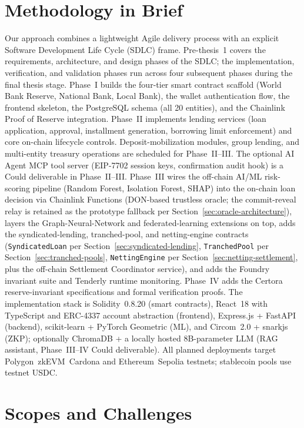 \documentclass[12pt,a4paper]{report}
\begin{document}
\section{Methodology in Brief}

Our approach combines a lightweight Agile delivery process with an explicit Software Development Life Cycle (SDLC) frame. Pre-thesis~1 covers the requirements, architecture, and design phases of the SDLC; the implementation, verification, and validation phases run across four subsequent phases during the final thesis stage. Phase~I builds the four-tier smart contract scaffold (World Bank Reserve, National Bank, Local Bank), the wallet authentication flow, the frontend skeleton, the PostgreSQL schema (all 20 entities), and the Chainlink Proof of Reserve integration. Phase~II implements lending services (loan application, approval, installment generation, borrowing limit enforcement) and core on-chain lifecycle controls. Deposit-mobilization modules, group lending, and multi-entity treasury operations are scheduled for Phase~II--III. The optional AI Agent MCP tool server (EIP-7702 session keys, confirmation audit hook) is a Could deliverable in Phase~II--III. Phase~III wires the off-chain AI/ML risk-scoring pipeline (Random Forest, Isolation Forest, SHAP) into the on-chain loan decision via Chainlink Functions (DON-based trustless oracle; the commit-reveal relay is retained as the prototype fallback per Section~\ref{sec:oracle-architecture}), layers the Graph-Neural-Network and federated-learning extensions on top, adds the syndicated-lending, tranched-pool, and netting-engine contracts (\texttt{SyndicatedLoan} per Section~\ref{sec:syndicated-lending}, \texttt{TranchedPool} per Section~\ref{sec:tranched-pools}, \texttt{NettingEngine} per Section~\ref{sec:netting-settlement}, plus the off-chain Settlement Coordinator service), and adds the Foundry invariant suite and Tenderly runtime monitoring. Phase~IV adds the Certora reserve-invariant specifications and formal verification proofs. The implementation stack is Solidity~0.8.20 (smart contracts), React~18 with TypeScript and ERC-4337 account abstraction (frontend), Express.js + FastAPI (backend), scikit-learn + PyTorch Geometric (ML), and Circom~2.0 + snarkjs (ZKP); optionally ChromaDB + a locally hosted 8B-parameter LLM (RAG assistant, Phase~III--IV Could deliverable). All planned deployments target Polygon~zkEVM~Cardona and Ethereum~Sepolia testnets; stablecoin pools use testnet USDC.

\section{Scopes and Challenges}
\label{sec:scopes-challenges}
\end{document}
